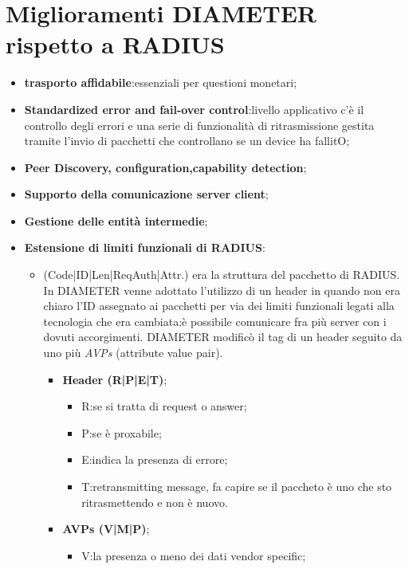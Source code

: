 \documentclass{book}
\theoremstyle{remark}
\begin{document}
\section{Miglioramenti DIAMETER rispetto a RADIUS}
\begin{itemize}
	\item \textbf{trasporto affidabile}: essenziali per questioni monetari;\@
	\item \textbf{Standardized error and fail-over control}:\@al livello applicativo c'è il controllo degli errori e una serie di funzionalità di ritrasmissione gestita tramite l'invio di pacchetti che controllano se un device ha fallitO;\@
	      \item\textbf{Peer Discovery, configuration,capability detection};\@
	\item \textbf{Supporto della comunicazione server client};\@
	\item \textbf{Gestione delle entità intermedie};\@
	      \item\textbf{Estensione di limiti funzionali di RADIUS}:\begin{itemize}
		      \item (Code|ID|Len|ReqAuth|Attr.) era la struttura del pacchetto di RADIUS\@. In DIAMETER venne adottato l'utilizzo di un header in quando non era chiaro l'ID assegnato ai pacchetti per via dei limiti funzionali legati alla tecnologia che era cambiata:\@adesso è possibile comunicare fra più server con i dovuti accorgimenti\@. DIAMETER modificò il tag di un header seguito da uno più \emph{AVPs} (attribute value pair)\@.
		            \begin{itemize}
			            \item \textbf{Header (R|P|E|T)};\@\begin{itemize}
				                  \item R:\@specifica se si tratta di request o answer;\@
				                  \item P:\@indica se è proxabile;\@
				                  \item E:indica la presenza di errore;\@
				                  \item T:\@potentially retransmitting message, fa capire se il paccheto è uno che sto ritrasmettendo e non è nuovo\@.
			                  \end{itemize}
			            \item \textbf{AVPs (V|M|P)};\@\begin{itemize}
				                  \item V:\@indica la presenza o meno dei dati vendor specific;\@

\end{itemize}
\end{itemize}
\end{itemize}
\end{itemize}
\end{document}
